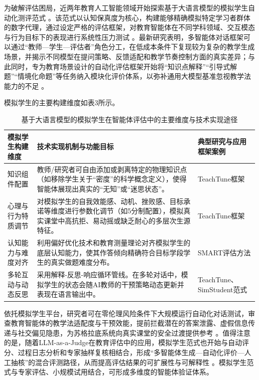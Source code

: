 为破解评估困局，近两年教育人工智能领域开始探索基于大语言模型的模拟学生自动化测评范式 \citep{ref39}。该范式以认知保真度为核心，构建能够精确模拟特定学习者群体的数字代理，通过设定严格的评估框架，对教育智能体在不同学科领域、交互模态与行为目标下的表现进行系统性压力测试 \citep{ref39}。最新研究表明，多智能体对话框架可以通过“教师—学生—评估者”角色分工，在低成本条件下复现较为复杂的教学生成场景，并揭示不同模型在提问策略、反馈适配和教学节奏控制方面的真实差异；与此同时，专为教育场景设计的自动化评估框架开始将“知识点解释”“引导式解题”“情境化命题”等任务纳入模块化评价体系，以弥补通用大模型基准忽视教学法能力的不足 \citep{shi2025educationq,weib2025elmes}。

模拟学生的主要构建维度如表3所示。

\begin{table}[htbp]
\caption{基于大语言模型的模拟学生在智能体评估中的主要维度与技术实现途径}
\label{tab:3}
\begin{tabularx}{\textwidth}{|X|X|X|}
\hline
模拟学生构建维度 & 技术实现机制与功能目标 & 典型研究与应用框架案例 \\
\hline
知识组件配置 & 教师/研究者可自由添加或剥离特定的物理知识点（如移除学生关于“密度”的科学概念定义），使得智能体展现出真实的“无知”或“迷思状态”。 & TeachTune框架 \citep{ref40} \\
\hline
心理与行为特质调节 & 对模拟学生的自我效能感、动机、挫败感、目标承诺等维度进行参数化调节（如5分制配置），模拟真实课堂中高抗拒、易动摇或缺乏耐心的多层次生源特征。 & TeachTune框架 \citep{ref41} \\
\hline
认知能力与难度对齐 & 利用偏好优化技术和教育测量理论对齐模拟学生的底层认知能力，使其作答倾向精确符合目标学段学生的真实做题难度分布。 & SMART评估方法 \citep{ref66} \\
\hline
多轮互动与动态反思 & 采用解释-反思-响应循环管线。在多轮对话中，模拟学生的状态会随AI教师的干预策略动态更新并表现在语言输出中。 & TeachTune、SimStudent范式 \citep{ref39} \\
\hline
\end{tabularx}
\end{table}

依托模拟学生平台，研究者可在零伦理风险条件下大规模运行自动化对话测试，审查教育智能体的教学法适配度与干预效能，提前拦截潜在的答案泄露、虚假信息传递与社交偏见隐患，为苏格拉底系统向真实课堂的安全过渡提供参考 \citep{ref39}。值得注意的是，随着LLM-as-a-Judge在教育评估中的应用，模拟学生范式也开始与自动评分、过程日志分析和专家抽样复核相结合，形成“多智能体生成—自动化评价—人工抽核”的混合评测路径，从而提高评估结果的可扩展性与可解释性 \citep{seo2025llmevaluators,weib2025elmes}。模拟学生范式与专家评估、小规模试用结合，可形成多维度的智能体验证体系。

